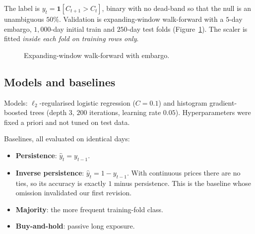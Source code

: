 \documentclass[preprint,12pt,authoryear]{elsarticle}
\begin{document}
The label is $y_t = \mathbf{1}[C_{t+1} > C_t]$, binary with no dead-band so that
the null is an unambiguous $50\%$. Validation is expanding-window walk-forward
with a $5$-day embargo, $1{,}000$-day initial train and $250$-day test folds
(Figure~\ref{fig:wf}). The scaler is fitted \emph{inside each fold on training
rows only}.

\begin{figure}[t]\centering
{}
\caption{Expanding-window walk-forward with embargo.}
\label{fig:wf}
\end{figure}

\subsection{Models and baselines}

Models: $\ell_2$-regularised logistic regression ($C = 0.1$) and histogram
gradient-boosted trees (depth $3$, $200$ iterations, learning rate $0.05$).
Hyperparameters were fixed a priori and not tuned on test data.

Baselines, all evaluated on identical days:
\begin{itemize}
\item \textbf{Persistence}: $\hat{y}_t = y_{t-1}$.
\item \textbf{Inverse persistence}: $\hat{y}_t = 1 - y_{t-1}$. With continuous
prices there are no ties, so its accuracy is exactly $1$ minus persistence. This
is the baseline whose omission invalidated our first revision.
\item \textbf{Majority}: the more frequent training-fold class.
\item \textbf{Buy-and-hold}: passive long exposure.
\end{itemize}
\end{document}

